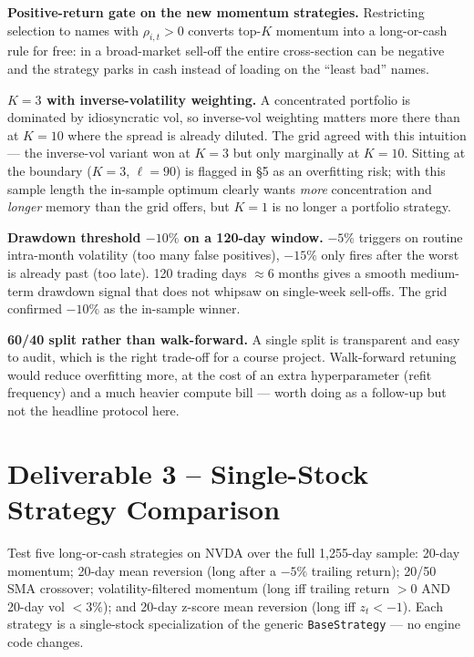 \documentclass[11pt]{article}
\begin{document}
\textbf{Positive-return gate on the new momentum strategies.}
Restricting selection to names with $\rho_{i,t} > 0$ converts top-$K$
momentum into a long-or-cash rule for free: in a broad-market sell-off
the entire cross-section can be negative and the strategy parks in
cash instead of loading on the ``least bad'' names.

\textbf{$K{=}3$ with inverse-volatility weighting.}
A concentrated portfolio is dominated by idiosyncratic vol, so
inverse-vol weighting matters more there than at $K{=}10$ where the
spread is already diluted. The grid agreed with this intuition ---
the inverse-vol variant won at $K{=}3$ but only marginally at $K{=}10$.
Sitting at the boundary ($K{=}3$, $\ell{=}90$) is flagged in \S5 as
an overfitting risk; with this sample length the in-sample optimum
clearly wants \emph{more} concentration and \emph{longer} memory than
the grid offers, but $K{=}1$ is no longer a portfolio strategy.

\textbf{Drawdown threshold $-10\%$ on a 120-day window.}
$-5\%$ triggers on routine intra-month volatility (too many false
positives), $-15\%$ only fires after the worst is already past
(too late). 120 trading days $\approx 6$ months gives a smooth
medium-term drawdown signal that does not whipsaw on single-week
sell-offs. The grid confirmed $-10\%$ as the in-sample winner.

\textbf{60/40 split rather than walk-forward.}
A single split is transparent and easy to audit, which is the right
trade-off for a course project. Walk-forward retuning would reduce
overfitting more, at the cost of an extra hyperparameter (refit
frequency) and a much heavier compute bill --- worth doing as a
follow-up but not the headline protocol here.

\section{Deliverable 3 -- Single-Stock Strategy Comparison}

Test five long-or-cash strategies on NVDA over the full 1{,}255-day
sample: 20-day momentum; 20-day mean reversion (long after a $-5\%$
trailing return); 20/50 SMA crossover; volatility-filtered momentum
(long iff trailing return $> 0$ AND 20-day vol $< 3\%$); and 20-day
z-score mean reversion (long iff $z_t < -1$). Each strategy is a
single-stock specialization of the generic \texttt{BaseStrategy} ---
no engine code changes.
\end{document}
